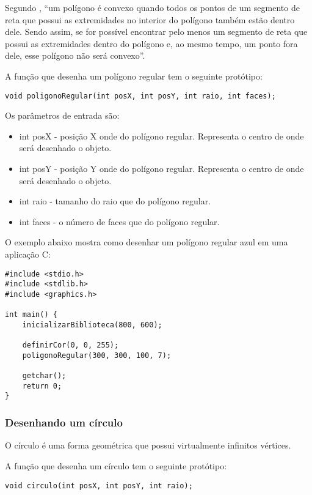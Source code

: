 \documentclass[12pt, %
openright,
oneside, %
a4paper,    %
brazil]{facom-ufu-abntex2}
\begin{document}
Segundo , ``um polígono é convexo quando todos os pontos de um segmento de reta que possui as extremidades no interior do polígono também estão dentro dele. Sendo assim, se for possível encontrar pelo menos um segmento de reta que possui as extremidades dentro do polígono e, ao mesmo tempo, um ponto fora dele, esse polígono não será convexo''.

A função que desenha um polígono regular tem o seguinte protótipo:

\begin{verbatim}
void poligonoRegular(int posX, int posY, int raio, int faces);
\end{verbatim}

Os parâmetros de entrada são:

\begin{itemize}
    \item int posX - posição X onde do polígono regular. Representa o centro de onde será desenhado o objeto.
    \item int posY - posição Y onde do polígono regular. Representa o centro de onde será desenhado o objeto.
    \item int raio - tamanho do raio que do polígono regular.
    \item int faces - o número de faces que do polígono regular.
\end{itemize}

O exemplo abaixo mostra como desenhar um polígono regular azul em uma aplicação C:

\begin{verbatim}
#include <stdio.h>
#include <stdlib.h>
#include <graphics.h>

int main() {
    inicializarBiblioteca(800, 600);

    definirCor(0, 0, 255);
    poligonoRegular(300, 300, 100, 7);

    getchar();
    return 0;
}
\end{verbatim}

\subsubsection{Desenhando um círculo}
O círculo é uma forma geométrica que possui virtualmente infinitos vértices.

A função que desenha um círculo tem o seguinte protótipo:

\begin{verbatim}
void circulo(int posX, int posY, int raio);
\end{verbatim}
\end{document}
